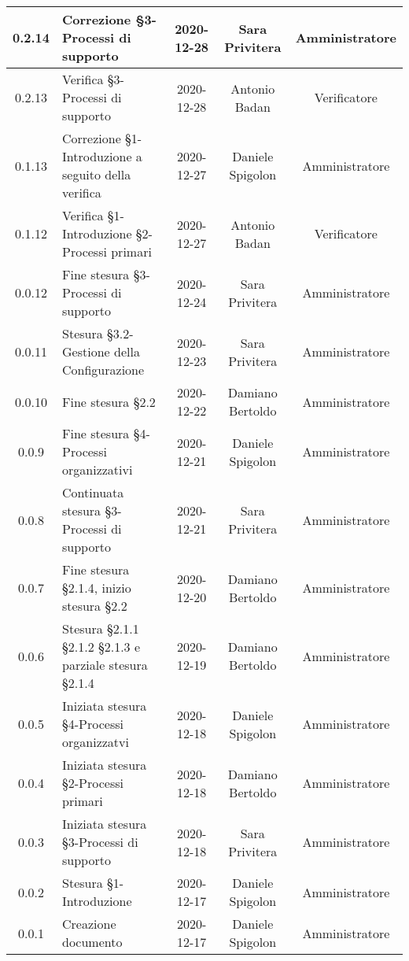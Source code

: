 \begin{center}
\begin{longtable}{|c|p{5cm}|c|c|c|}
	\hline
	0.2.14 & Correzione §3-Processi di supporto  & 2020-12-28 & Sara Privitera & Amministratore \\
	\hline
	0.2.13 & Verifica §3-Processi di supporto  & 2020-12-28 & Antonio Badan & Verificatore \\
	\hline
	0.1.13 & Correzione §1-Introduzione a seguito della verifica  & 2020-12-27 & Daniele Spigolon & Amministratore \\
	\hline
	0.1.12 & Verifica §1-Introduzione §2-Processi primari  & 2020-12-27 & Antonio Badan & Verificatore \\
	\hline
	0.0.12 & Fine stesura §3-Processi di supporto & 2020-12-24 & Sara Privitera & Amministratore \\
	\hline
	0.0.11 & Stesura §3.2-Gestione della Configurazione & 2020-12-23 & Sara Privitera & Amministratore \\
	\hline
	0.0.10 & Fine stesura §2.2 & 2020-12-22 & Damiano Bertoldo & Amministratore \\
	\hline
	0.0.9 & Fine stesura §4-Processi organizzativi & 2020-12-21 & Daniele Spigolon & Amministratore \\
	\hline
	0.0.8 & Continuata stesura §3-Processi di supporto & 2020-12-21 & Sara Privitera & Amministratore \\
	\hline
	0.0.7 & Fine stesura §2.1.4, inizio stesura §2.2 & 2020-12-20 & Damiano Bertoldo & Amministratore \\
	\hline
	0.0.6 & Stesura §2.1.1 §2.1.2 §2.1.3 e parziale stesura §2.1.4 & 2020-12-19 & Damiano Bertoldo & Amministratore \\
	\hline
	0.0.5 & Iniziata stesura §4-Processi organizzatvi & 2020-12-18 & Daniele Spigolon & Amministratore \\
	\hline
	0.0.4 & Iniziata stesura §2-Processi primari & 2020-12-18 & Damiano Bertoldo & Amministratore \\
	\hline
	0.0.3 & Iniziata stesura §3-Processi di supporto & 2020-12-18 & Sara Privitera & Amministratore \\
	\hline
	0.0.2 & Stesura §1-Introduzione & 2020-12-17 & Daniele Spigolon & Amministratore \\
	\hline
	0.0.1 & Creazione documento & 2020-12-17 & Daniele Spigolon & Amministratore \\
	\hline
	
	

	\end{longtable}
\end{center}
